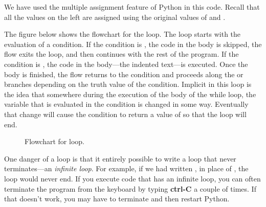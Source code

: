 \documentclass[letterpaper,10pt,english]{sphinxmanual}
\begin{document}
We have used the multiple assignment feature of Python in this code.  Recall that all the values on the left are assigned using the original values of  and .

The figure below shows the flowchart for the  loop.  The loop starts with the evaluation of a condition.  If the condition is , the code in the body is skipped, the flow exits the loop, and then continues with the rest of the program.  If the condition is , the code in the body---the indented text---is executed.  Once the body is finished, the flow returns to the condition and proceeds along the  or  branches depending on the truth value of the condition.  Implicit in this loop is the idea that somewhere during the execution of the body of the while loop, the variable that is evaluated in the condition is changed in some way.  Eventually that change will cause the condition to return a value of  so that the loop will end.
\begin{figure}[htbp]
\centering
\capstart

\caption{Flowchart for  loop.}\label{chap6/chap6_loopsconds:fig-flow-while}\end{figure}

One danger of a  loop is that it entirely possible to write a loop that never terminates---an \emph{infinite loop}.  For example, if we had written , in place of , the loop would never end.  If you execute code that has an infinite loop, you can often terminate the program from the keyboard by typing \textbf{ctrl-C} a couple of times.  If that doesn't work, you may have to terminate and then restart Python.
\end{document}
